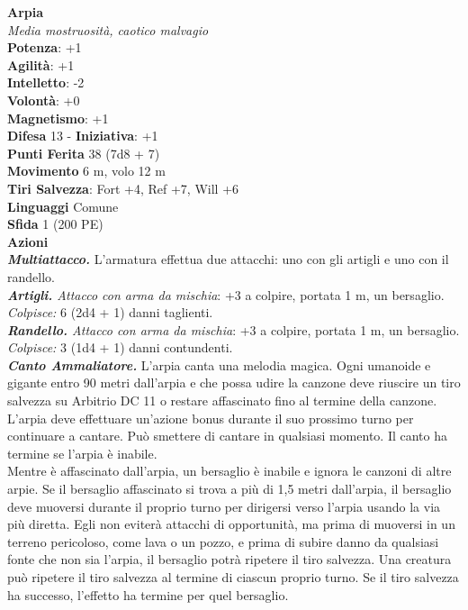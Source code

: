 \begin{multicols}{2}
\medskip\textbf{Arpia}\\
\emph{Media mostruosità, caotico malvagio}\\
\textbf{Potenza}: +1\\
\textbf{Agilità}: +1\\
\textbf{Intelletto}: -2\\
\textbf{Volontà}: +0\\
\textbf{Magnetismo}: +1\\
\textbf{Difesa} 13 - \textbf{Iniziativa}: +1\\
\textbf{Punti Ferita} 38 (7d8 + 7)\\
\textbf{Movimento} 6 m, volo 12 m\\
\textbf{Tiri Salvezza}: Fort +4, Ref +7, Will +6\\
\textbf{Linguaggi} Comune\\
\textbf{Sfida} 1 (200 PE)\smallskip\\
\smallskip\textbf{Azioni}\\
\emph{\textbf{Multiattacco.}} L'armatura effettua due attacchi: uno con gli artigli e uno con il randello.\\
\emph{\textbf{Artigli.} Attacco con arma da mischia}: +3 a colpire, portata 1 m, un bersaglio.\\
\emph{Colpisce:} 6 (2d4 + 1) danni taglienti.\\
\emph{\textbf{Randello.} Attacco con arma da mischia}: +3 a colpire, portata 1 m, un bersaglio.\\
\emph{Colpisce:} 3 (1d4 + 1) danni contundenti.\\
\emph{\textbf{Canto Ammaliatore.}} L'arpia canta una melodia magica. Ogni umanoide e gigante entro 90 metri dall'arpia e che possa udire la canzone deve riuscire un tiro salvezza su Arbitrio DC 11 o restare affascinato fino al termine della canzone. L'arpia deve effettuare un'azione bonus durante il suo prossimo turno per continuare a cantare. Può smettere di cantare in qualsiasi momento. Il canto ha termine se l'arpia è inabile.\\
Mentre è affascinato dall'arpia, un bersaglio è inabile e ignora le canzoni di altre arpie. Se il bersaglio affascinato si trova a più di 1,5 metri dall'arpia, il bersaglio deve muoversi durante il proprio turno per dirigersi verso l'arpia usando la via più diretta. Egli non eviterà attacchi di opportunità, ma prima di muoversi in un terreno pericoloso, come lava o un pozzo, e prima di subire danno da qualsiasi fonte che non sia l'arpia, il bersaglio potrà ripetere il tiro salvezza. Una creatura può ripetere il tiro salvezza al termine di ciascun proprio turno. Se il tiro salvezza ha successo, l'effetto ha termine per quel bersaglio.\\

\end{multicols}
